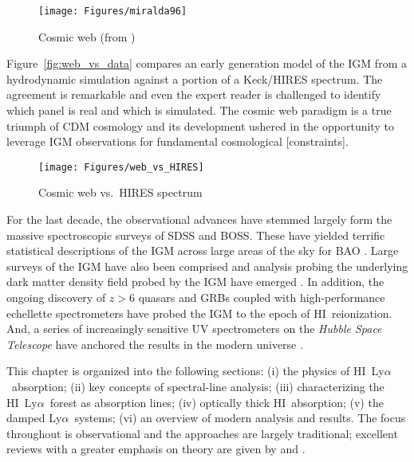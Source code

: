 \documentclass[graybox]{svmult}
\newcommand{\HI}{H{\sc I}}
\def\lya{Ly$\alpha$}
\begin{document}
%
\begin{figure}[b]
\sidecaption
\texttt{[image: Figures/miralda96]}
%
%
\caption{Cosmic web (from \cite{miralda96})
}
\label{fig:web}       %
\end{figure}


Figure~\ref{fig:web_vs_data} compares an early generation
model of the IGM from a hydrodynamic simulation 
against a portion of a Keck/HIRES spectrum.  The
agreement is remarkable and even the expert reader
is challenged to identify which panel is real and
which is simulated.
The cosmic web paradigm is a true triumph of CDM
cosmology and its development ushered in the 
opportunity to leverage IGM observations for fundamental
cosmological [constraints].

%
\begin{figure}[b]
\sidecaption
\texttt{[image: Figures/web\_vs\_HIRES]}
%
%
\caption{Cosmic web vs.\ HIRES spectrum
}
\label{fig:web_vs_HIRES}       %
\end{figure}


For the last decade, the observational advances
have stemmed largely form the massive spectroscopic
surveys of SDSS and BOSS.
These have yielded terrific statistical descriptions
of the IGM \cite{PDF} 
across large areas of the sky for BAO \cite{IGM_BAO}.
Large surveys of the IGM have also been comprised
\cite{phw05,pow10,noterdaeme} and
analysis probing the underlying dark matter density
field probed by the IGM have emerged \cite{font}.
In addition, the ongoing discovery of $z>6$ quasars 
and GRBs coupled with high-performance echellette
spectrometers have probed the IGM to the epoch
of \HI\ reionization.  And, a series of increasingly
sensitive UV spectrometers on the
{\it Hubble Space Telescope}
have anchored the results in the modern universe
\cite{penton,tripp,xx}.

This chapter is organized into the following sections:
 (i) the physics of \HI\ \lya\ absorption;
 (ii) key concepts of spectral-line analysis;
 (iii) characterizing the \HI\ \lya\ forest as absorption lines;
 (iv) optically thick \HI\ absorption;
 (v) the damped \lya\ systems;
 (vi) an overview of modern analysis and results.
The focus throughout is observational and the approaches
are largely traditional;  excellent reviews with a greater
emphasis on theory are given by \cite{meiksin0X} and
\cite{mcquinn1X}.  
\end{document}
